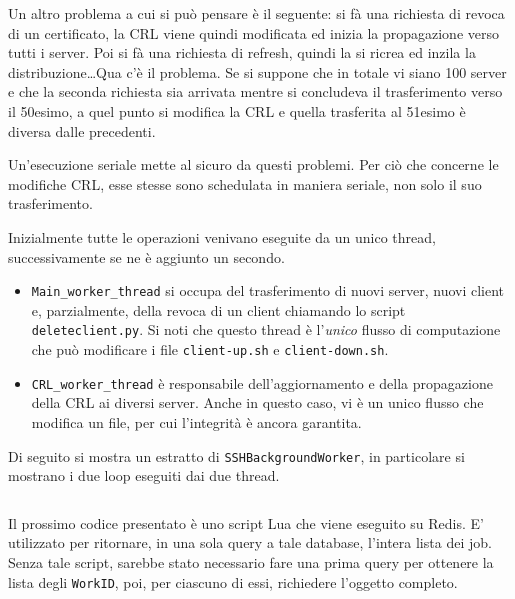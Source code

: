 Un altro problema a cui si può pensare è il seguente: si fà una richiesta di revoca di un certificato,
la CRL viene quindi modificata ed inizia la propagazione verso tutti i server.
Poi si fà una richiesta di refresh, quindi la si ricrea ed inzila la distribuzione\ldots Qua c'è il
problema. Se si suppone che in totale vi siano 100 server e che la seconda richiesta sia arrivata
mentre si concludeva il trasferimento verso il 50esimo, a quel punto si modifica la CRL
e quella trasferita al 51esimo è diversa dalle precedenti.

Un'esecuzione seriale mette al sicuro da questi problemi.
Per ciò che concerne le modifiche CRL, esse stesse sono
schedulata in maniera seriale, non solo il suo trasferimento.


Inizialmente tutte le operazioni venivano eseguite da un unico thread, successivamente se ne
è aggiunto un secondo.
\begin{itemize}
	\item \texttt{Main\_worker\_thread} si occupa del trasferimento di nuovi server, nuovi
	      client e, parzialmente, della revoca di un client chiamando lo script \texttt{deleteclient.py}.
	      Si noti che questo thread è l'\textit{unico} flusso di computazione che può modificare
	      i file \texttt{client-up.sh} e \texttt{client-down.sh}.
	\item \texttt{CRL\_worker\_thread} è responsabile dell'aggiornamento e della propagazione
	      della CRL ai diversi server. Anche in questo caso, vi è un unico flusso che modifica
	      un file, per cui l'integrità è ancora garantita.
\end{itemize}


Di seguito si mostra un estratto di \texttt{SSHBackgroundWorker}, in particolare si mostrano
i due loop eseguiti dai due thread.

\inputminted[tabsize=4, breaklines, fontsize=\footnotesize]{python}{code_samples/sshworker_loops.py}

Il prossimo codice presentato è uno script Lua che viene eseguito su Redis. E' utilizzato
per ritornare, in una sola query a tale database, l'intera lista dei job.
Senza tale script, sarebbe stato necessario fare una prima query per ottenere la lista degli
\texttt{WorkID}, poi, per ciascuno di essi, richiedere l'oggetto completo.

\inputminted[tabsize=4, breaklines, fontsize=\footnotesize]{lua}{code_samples/works.lua}


